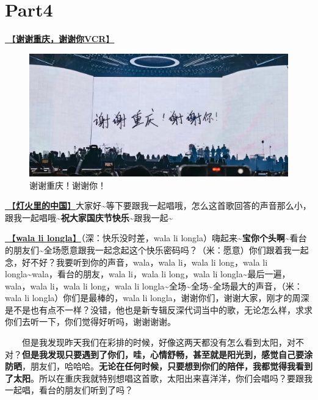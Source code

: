 \documentclass[]{ctexbook}
\begin{document}
\section{Part4}\label{chongqing-20241006-part4}

\hyperref[thank-you-vcr]{🎥【\textbf{谢谢重庆，谢谢你VCR}】}

\begin{figure}

{\centering \includegraphics[width=400pt]{img/chongqing20241006/thank-chongqing} 

}

\caption{谢谢重庆！谢谢你！}\label{fig:unnamed-chunk-114}
\end{figure}

\hyperref[China-in-the-light]{🎵【\textbf{灯火里的中国}】}大家好\textasciitilde 等下要跟我一起唱哦，怎么这首歌回答的声音那么小，跟我一起唱哦\textasciitilde{}\textbf{祝大家国庆节快乐\textasciitilde{}}跟我一起\textasciitilde{}

\hyperref[wala-li-longla]{🎵【\textbf{wala li longla}】}（深：快乐没时差，wala li longla）嗨起来\textasciitilde{}\textbf{宝你个头啊\textasciitilde{}}看台的朋友们\textasciitilde 全场愿意跟我一起念起这个快乐密码吗？（米：愿意）你们跟着我一起念，好不好？我要听到你的声音，wala，wala li，wala li long，wala li longla\textasciitilde wala，看台的朋友，wala li，wala li long，wala li longla\textasciitilde 最后一遍，wala，wala li，wala li long，wala li longla\textasciitilde 全场\textasciitilde 全场\textasciitilde 全场最大的声音，（米：wala li longla）你们是最棒的，wala li longla，谢谢你们，谢谢大家，刚才的周深是不是也有点不一样？没错，他也是新专辑反深代词当中的歌，无论怎么样，求求你们去听一下，你们觉得好听吗，谢谢谢谢。

  但是我发现昨天我们在彩排的时候，好像这两天都没有怎么看到太阳，对不对？\textbf{但是我发现只要遇到了你们，哇，心情舒畅，甚至就是阳光到，感觉自己要涂防晒}，朋友们，哈哈哈。\textbf{无论在任何时候，只要想到你们的陪伴，我都觉得我看到了太阳}。所以在重庆我就特别想唱这首歌，太阳出来喜洋洋，你们会唱吗？要跟我一起唱，看台的朋友们听到了吗？
\end{document}
